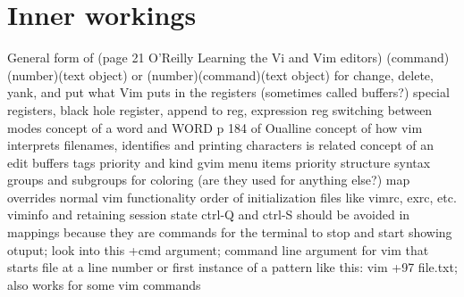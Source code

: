 \documentclass[12pt]{book}
\begin{document}
\section{Inner workings}
General form of (page 21 O'Reilly Learning the Vi and Vim editors) (command)(number)(text object) or (number)(command)(text object) for change, delete, yank, and put
what Vim puts in the registers (sometimes called buffers?) special registers, black hole register, append to reg, expression reg
switching between modes
concept of a word and WORD p 184 of Oualline
  concept of how vim interprets filenames, identifies and printing characters is related
concept of an edit
buffers
tags priority and kind
gvim menu items priority structure
syntax groups and subgroups for coloring (are they used for anything else?)
map overrides normal vim functionality
order of initialization files like vimrc, exrc, etc.
viminfo and retaining session state
ctrl-Q and ctrl-S should be avoided in mappings because they are commands for the terminal to stop and start showing otuput; look into this
+cmd argument; command line argument for vim that starts file at a line number or first instance of a pattern like this: vim +97 file.txt; also works for some vim commands
\end{document}
